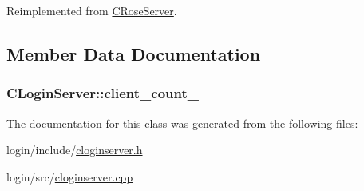 Reimplemented from \hyperlink{classCRoseServer_a7d3dc93a0a3495c2233aced6b8ca9733}{C\+Rose\+Server}.



\subsection{Member Data Documentation}
\subsubsection[{\texorpdfstring{client\+\_\+count\+\_\+}{client_count_}}]{ C\+Login\+Server\+::client\+\_\+count\+\_\+\hspace{0.3cm}{\ttfamily [protected]}}\hypertarget{classCLoginServer_ab6d80c527cbdbf6834960d5902caca09}{}\label{classCLoginServer_ab6d80c527cbdbf6834960d5902caca09}


The documentation for this class was generated from the following files\+:\begin{DoxyCompactItemize}
\item 
login/include/\hyperlink{cloginserver_8h}{cloginserver.\+h}\item 
login/src/\hyperlink{cloginserver_8cpp}{cloginserver.\+cpp}\end{DoxyCompactItemize}
